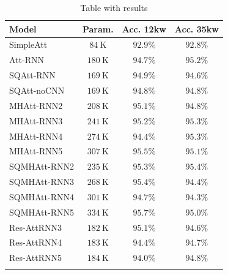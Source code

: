 \begin{table}

	\caption{Table with results}

\begin{tabular}{lccc}	
	\hline 
	Model & Param. & Acc. 12kw & Acc. 35kw \\
	\hline \hline
	
	\rule{0pt}{3ex}SimpleAtt & $84 \mathrm{~K}$ & $92.9 \%$ & $92.8 \%$ \\
	Att-RNN & $180 \mathrm{~K}$& $94.7 \%$& $95.2 \%$ \\
	\hline 
	\rule{0pt}{3ex}SQAtt-RNN & $169 \mathrm{~K}$  & $94.9 \%$& $94.6 \%$ \\
	SQAtt-noCNN & $169 \mathrm{~K}$ & $94.8 \%$& $94.8 \%$ \\
	\hline \rule{0pt}{3ex}MHAtt-RNN2 & $208 \mathrm{~K}$ & $95.1 \%$& $94.8 \%$ \\
	MHAtt-RNN3 & $241 \mathrm{~K}$ & $95.2 \%$ & $95.3 \%$\\
	MHAtt-RNN4 & $274 \mathrm{~K}$ & $ 94.4\%$& $95.3 \%$ \\
	MHAtt-RNN5 & $307 \mathrm{~K}$ & $ 95.5\%$& $95.1 \%$ \\
	\hline \rule{0pt}{3ex}SQMHAtt-RNN2 &$235 \mathrm{~K}$ & $95.3 \%$& $\mathbf{95.4} \%$ \\
	SQMHAtt-RNN3 &$268 \mathrm{~K}$ & $95.4 \%$& $94.4 \%$ \\
	SQMHAtt-RNN4& $301 \mathrm{~K}$ & $94.7 \%$& $94.3 \%$ \\
	SQMHAtt-RNN5& $334 \mathrm{~K}$ & $\mathbf{95.7 \%}$& $95.0 \%$ \\
	\hline \rule{0pt}{3ex}Res-AttRNN3 &$182 \mathrm{~K}$ & $95.1\%$& $94.6 \%$ \\
	Res-AttRNN4& $183 \mathrm{~K}$ & $94.4 \%$& $94.7 \%$ \\
	Res-AttRNN5& $184 \mathrm{~K}$ & $94.0\%$& $94.8 \%$ \\
	\hline
	
	\label{table:results}
\end{tabular}
\end{table}

